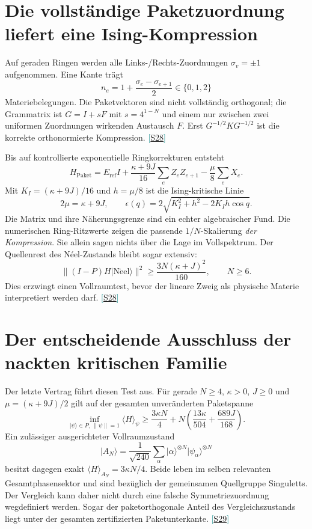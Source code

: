\documentclass[11pt,a4paper,oneside,parskip=half,headings=normal,numbers=noenddot,bibliography=totoc]{scrreprt}
\newcommand{\ket}[1]{\lvert #1\rangle}
\newcommand{\src}[1]{\textcolor{teal}{\small[\hyperref[s:#1]{S#1}]}}
\begin{document}
\section{Die vollständige Paketzuordnung liefert eine Ising-Kompression}
Auf geraden Ringen werden alle Links-/Rechts-Zuordnungen $\sigma_v=\pm1$ aufgenommen. Eine Kante trägt
\[
 n_e=1+\frac{\sigma_e-\sigma_{e+1}}2\in\{0,1,2\}
\]
Materiebelegungen. Die Paketvektoren sind nicht vollständig orthogonal; die Grammatrix ist $G=I+sF$ mit $s=4^{1-N}$ und einem nur zwischen zwei uniformen Zuordnungen wirkenden Austausch $F$. Erst $G^{-1/2}KG^{-1/2}$ ist die korrekte orthonormierte Kompression. \src{28}

Bis auf kontrollierte exponentielle Ringkorrekturen entsteht
\[
 H_{\mathrm{Paket}}=E_{\mathrm{ref}}I
 +\frac{\kappa+9J}{16}\sum_e Z_eZ_{e+1}
 -\frac\mu8\sum_e X_e.
\]
Mit $K_I=(\kappa+9J)/16$ und $h=\mu/8$ ist die Ising-kritische Linie
\[
 2\mu=\kappa+9J,\qquad
 \epsilon(q)=2\sqrt{K_I^2+h^2-2K_Ih\cos q}.
\]
Die Matrix und ihre Näherungsgrenze sind ein echter algebraischer Fund. Die numerischen Ring-Ritzwerte zeigen die passende $1/N$-Skalierung \emph{der Kompression}. Sie allein sagen nichts über die Lage im Vollspektrum. Der Quellenrest des Néel-Zustands bleibt sogar extensiv:
\[
 \|(I-P)H\ket{\mathrm{N\acute eel}}\|^2
 \ge\frac{3N(\kappa+J)^2}{160},\qquad N\ge6.
\]
Dies erzwingt einen Vollraumtest, bevor der lineare Zweig als physische Materie interpretiert werden darf. \src{28}

\section{Der entscheidende Ausschluss der nackten kritischen Familie}
Der letzte Vertrag führt diesen Test aus. Für gerade $N\ge4$, $\kappa>0$, $J\ge0$ und $\mu=(\kappa+9J)/2$ gilt auf der gesamten unveränderten Paketspanne
\[
 \inf_{\ket\psi\in P,\ \|\psi\|=1}\langle H\rangle_\psi
 \ge\frac{3\kappa N}{4}
 +N\left(\frac{13\kappa}{504}+\frac{689J}{168}\right).
\]
Ein zulässiger ausgerichteter Vollraumzustand
\[
 \ket{A_N}=\frac1{\sqrt{240}}\sum_\alpha
 \ket\alpha^{\otimes N}\ket{\psi_\alpha}^{\otimes N}
\]
besitzt dagegen exakt $\langle H\rangle_{A_N}=3\kappa N/4$. Beide leben im selben relevanten Gesamtphasensektor und sind bezüglich der gemeinsamen Quellgruppe Singuletts. Der Vergleich kann daher nicht durch eine falsche Symmetriezuordnung wegdefiniert werden. Sogar der paketorthogonale Anteil des Vergleichszustands liegt unter der gesamten zertifizierten Paketunterkante. \src{29}
\end{document}
